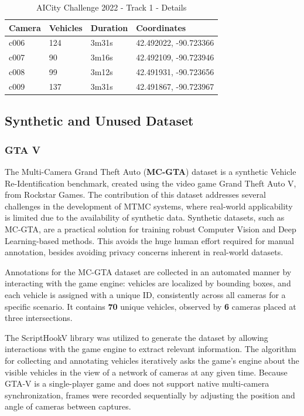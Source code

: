 \begin{table}[ht]
    \centering
    \caption{AICity Challenge 2022 - Track 1 - Details}
    \begin{tabular}{|l|l|l|l|}
    \hline
    \textbf{Camera} & \textbf{Vehicles} & \textbf{Duration} & \textbf{Coordinates}\\ \hline
    \hline
    c006 & 124 & 3m31s & 42.492022, -90.723366 \\ \hline
    c007 & 90 & 3m16s & 42.492109, -90.723946 \\ \hline
    c008 & 99 & 3m12s & 42.491931, -90.723656 \\ \hline
    c009 & 137 & 3m31s & 42.491867, -90.723967 \\ \hline
    \end{tabular}
    \label{table:AICity}
\end{table}

\subsection{Synthetic and Unused Dataset}

\subsubsection{GTA V}
The Multi-Camera Grand Theft Auto (\textbf{MC-GTA}) \cite{MC-GTA} dataset is a synthetic Vehicle Re-Identification benchmark, created using the video game Grand Theft Auto V, from Rockstar Games. The contribution of this dataset addresses several challenges in the development of MTMC systems, where real-world applicability is limited due to the availability of synthetic data. Synthetic datasets, such as MC-GTA, are a practical solution for training robust Computer Vision and Deep Learning-based methods. This avoids the huge human effort required for manual annotation, besides avoiding privacy concerns inherent in real-world datasets.

Annotations for the MC-GTA dataset are collected in an automated manner by interacting with the game engine: vehicles are localized by bounding boxes, and each vehicle is assigned with a unique ID, consistently across all cameras for a specific scenario. It contains \textbf{70} unique vehicles, observed by \textbf{6} cameras placed at three intersections.

The ScriptHookV library was utilized to generate the dataset by allowing interactions with the game engine to extract relevant information. The algorithm for collecting and annotating vehicles iteratively asks the game's engine about the visible vehicles in the view of a network of cameras at any given time. Because GTA-V is a single-player game and does not support native multi-camera synchronization, frames were recorded sequentially by adjusting the position and angle of cameras between captures.

